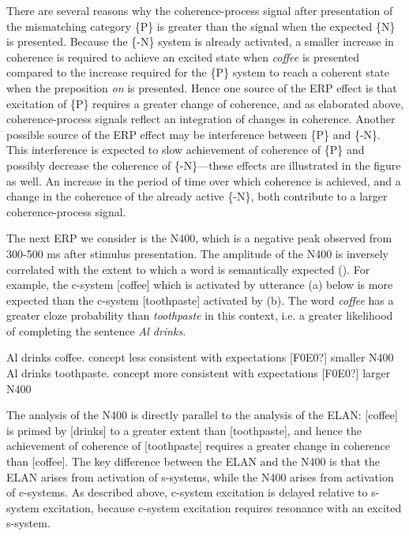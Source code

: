 There are several reasons why the coherence-process signal after presentation of the mismatching category \{P\} is greater than the signal when the expected \{N\} is presented. Because the \{-N\} system is already activated, a smaller increase in coherence is required to achieve an excited state when \textit{coffee} is presented compared to the increase required for the \{P\} system to reach a coherent state when the preposition \textit{on} is presented. Hence one source of the ERP effect is that excitation of \{P\} requires a greater change of coherence, and as elaborated above, coherence-process signals reflect an integration of changes in coherence. Another possible source of the ERP effect may be interference between \{P\} and \{-N\}. This interference is expected to slow achievement of coherence of \{P\} and possibly decrease the coherence of \{-N\}—these effects are illustrated in the figure as well. An increase in the period of time over which coherence is achieved, and a change in the coherence of the already active \{-N\}, both contribute to a larger coherence-process signal.

  The next ERP we consider is the N400, which is a negative peak observed from 300-500 ms after stimulus presentation. The amplitude of the N400 is inversely correlated with the extent to which a word is semantically expected (\citealt{FedermeierLaszlo2009,Friederici2002,KutasFedermeier2011}). For example, the c-system [coffee] which is activated by utterance (a) below is more expected than the c-system [toothpaste] activated by (b). The word \textit{coffee} has a greater cloze probability than \textit{toothpaste} in this context, i.e. a greater likelihood of completing the sentence \textit{Al drinks}.

\ea
\ea Al drinks coffee.         concept less consistent with expectations [F0E0?] smaller N400
\ex Al drinks toothpaste.    concept more consistent with expectations [F0E0?] larger N400
\z
\z

The analysis of the N400 is directly parallel to the analysis of the ELAN: [coffee] is primed by [drinks] to a greater extent than [toothpaste], and hence the achievement of coherence of [toothpaste] requires a greater change in coherence than [coffee]. The key difference between the ELAN and the N400 is that the ELAN arises from activation of s-systems, while the N400 arises from activation of c-systems. As described above, c-system excitation is delayed relative to s-system excitation, because c-system excitation requires resonance with an excited s-system.

